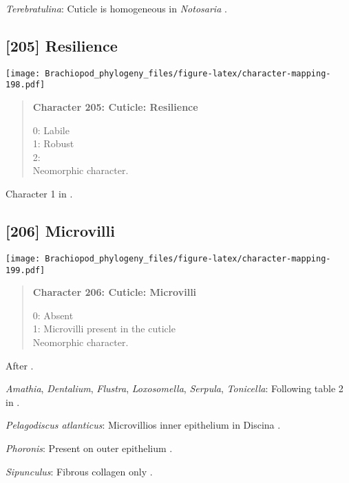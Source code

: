 \documentclass[openany]{book}
\theoremstyle{definition}
\theoremstyle{definition}
\theoremstyle{definition}
\theoremstyle{remark}
\begin{document}
\hypertarget{Terebratulina-coding-204}{}
\emph{Terebratulina}: Cuticle is homogeneous in \emph{Notosaria}
\citep{BereiterHahn1984, Williams1997Introduction}.

\subsection*{{[}205{]} Resilience}\label{resilience}

\texttt{[image: Brachiopod\_phylogeny\_files/figure-latex/character-mapping-198.pdf]}

\begin{quote}
\textbf{Character 205: Cuticle: Resilience}

0: Labile\\
1: Robust\\
2:\\
Neomorphic character.
\end{quote}

Character 1 in \citet{Haszprunar2000}.

\subsection*{{[}206{]} Microvilli}\label{microvilli}

\texttt{[image: Brachiopod\_phylogeny\_files/figure-latex/character-mapping-199.pdf]}

\begin{quote}
\textbf{Character 206: Cuticle: Microvilli}

0: Absent\\
1: Microvilli present in the cuticle\\
Neomorphic character.
\end{quote}

After \citet{Borisanova2015}.

\hypertarget{Amathia-coding-206}{}
\emph{Amathia}, \emph{Dentalium}, \emph{Flustra}, \emph{Loxosomella},
\emph{Serpula}, \emph{Tonicella}: Following table 2 in
\citet{Borisanova2015}.

\hypertarget{Pelagodiscus_atlanticus-coding-206}{}
\emph{Pelagodiscus atlanticus}: Microvillios inner epithelium in Discina
\citep{Williams1997Introduction}.

\hypertarget{Phoronis-coding-206}{}
\emph{Phoronis}: Present on outer epithelium \citep{BereiterHahn1984}.

\hypertarget{Sipunculus-coding-206}{}
\emph{Sipunculus}: Fibrous collagen only \citep{BereiterHahn1984}.
\end{document}
